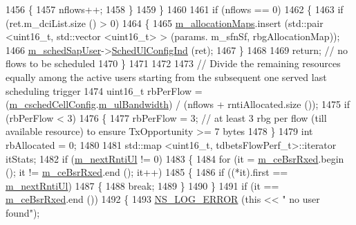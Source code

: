 \begin{DoxyCode}
1456         \{
1457           nflows++;
1458         \}
1459     \}
1460 
1461   \textcolor{keywordflow}{if} (nflows == 0)
1462     \{
1463       \textcolor{keywordflow}{if} (ret.m\_dciList.size () > 0)
1464         \{
1465           \hyperlink{classns3_1_1TdBetFfMacScheduler_a058a5b7d1c7c507d3fe3d9d12cc24ab7}{m\_allocationMaps}.insert (std::pair <uint16\_t, std::vector <uint16\_t> > (params.
      m\_sfnSf, rbgAllocationMap));
1466           \hyperlink{classns3_1_1TdBetFfMacScheduler_aac1731b516e0a6e45d76828f6c72eaa5}{m\_schedSapUser}->\hyperlink{classns3_1_1FfMacSchedSapUser_a1b89636256701a84d990db7db8aea874}{SchedUlConfigInd} (ret);
1467         \}
1468         
1469       \textcolor{keywordflow}{return};  \textcolor{comment}{// no flows to be scheduled}
1470     \}
1471 
1472 
1473   \textcolor{comment}{// Divide the remaining resources equally among the active users starting from the subsequent one served
       last scheduling trigger}
1474   uint16\_t rbPerFlow = (\hyperlink{classns3_1_1TdBetFfMacScheduler_a3e53aae0259501332769cd6ca4b74800}{m\_cschedCellConfig}.\hyperlink{structns3_1_1FfMacCschedSapProvider_1_1CschedCellConfigReqParameters_a5ab5b102878e6e7e7727a14af4a64d2f}{m\_ulBandwidth}) / (nflows + 
      rntiAllocated.size ());
1475   \textcolor{keywordflow}{if} (rbPerFlow < 3)
1476     \{
1477       rbPerFlow = 3;  \textcolor{comment}{// at least 3 rbg per flow (till available resource) to ensure TxOpportunity >= 7
       bytes}
1478     \}
1479   \textcolor{keywordtype}{int} rbAllocated = 0;
1480 
1481   std::map <uint16\_t, tdbetsFlowPerf\_t>::iterator itStats;
1482   \textcolor{keywordflow}{if} (\hyperlink{classns3_1_1TdBetFfMacScheduler_affbc3b6450778e77fbc0e20cb575d1b0}{m\_nextRntiUl} != 0)
1483     \{
1484       \textcolor{keywordflow}{for} (it = \hyperlink{classns3_1_1TdBetFfMacScheduler_ab10364d54dad2ec2afed0c168cdad4d3}{m\_ceBsrRxed}.begin (); it != \hyperlink{classns3_1_1TdBetFfMacScheduler_ab10364d54dad2ec2afed0c168cdad4d3}{m\_ceBsrRxed}.end (); it++)
1485         \{
1486           \textcolor{keywordflow}{if} ((*it).first == \hyperlink{classns3_1_1TdBetFfMacScheduler_affbc3b6450778e77fbc0e20cb575d1b0}{m\_nextRntiUl})
1487             \{
1488               \textcolor{keywordflow}{break};
1489             \}
1490         \}
1491       \textcolor{keywordflow}{if} (it == \hyperlink{classns3_1_1TdBetFfMacScheduler_ab10364d54dad2ec2afed0c168cdad4d3}{m\_ceBsrRxed}.end ())
1492         \{
1493           \hyperlink{group__logging_ga0261a8db1d4ac5f79417d117634fd455}{NS\_LOG\_ERROR} (\textcolor{keyword}{this} << \textcolor{stringliteral}{" no user found"});

\end{DoxyCode}
